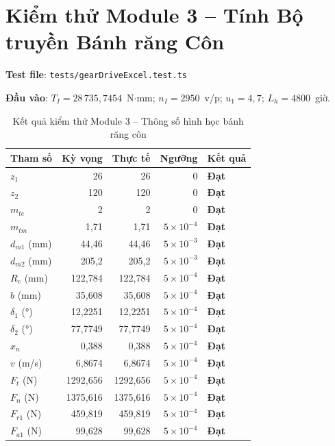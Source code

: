 \section{Kiểm thử Module 3 -- Tính Bộ truyền Bánh răng Côn}
\label{sec:test-m3}

\textbf{Test file}: \texttt{tests/gearDriveExcel.test.ts}

\textbf{Đầu vào}: $T_I = 28\,735{,}7454$~N$\cdot$mm; $n_I = 2950$~v/p;
$u_1 = 4{,}7$; $L_h = 4800$~giờ.

\begin{table}[H]
  \centering
  \caption{Kết quả kiểm thử Module 3 -- Thông số hình học bánh răng côn}
  \label{tab:test-m3-geom}
  \begin{tabular}{lrrrl}
    \toprule
    \textbf{Tham số} & \textbf{Kỳ vọng} & \textbf{Thực tế} & \textbf{Ngưỡng} & \textbf{Kết quả} \\
    \midrule
    $z_1$ & 26 & 26 & 0 & \textbf{Đạt} \\
    $z_2$ & 120 & 120 & 0 & \textbf{Đạt} \\
    $m_{te}$ & 2 & 2 & 0 & \textbf{Đạt} \\
    $m_{tm}$ & 1,71 & 1,71 & $5\times10^{-4}$ & \textbf{Đạt} \\
    $d_{m1}$ (mm) & 44,46 & 44,46 & $5\times10^{-3}$ & \textbf{Đạt} \\
    $d_{m2}$ (mm) & 205,2 & 205,2 & $5\times10^{-3}$ & \textbf{Đạt} \\
    $R_e$ (mm) & 122,784 & 122,784 & $5\times10^{-4}$ & \textbf{Đạt} \\
    $b$ (mm) & 35,608 & 35,608 & $5\times10^{-4}$ & \textbf{Đạt} \\
    $\delta_1$ ($°$) & 12,2251 & 12,2251 & $5\times10^{-4}$ & \textbf{Đạt} \\
    $\delta_2$ ($°$) & 77,7749 & 77,7749 & $5\times10^{-4}$ & \textbf{Đạt} \\
    $x_n$ & 0,388 & 0,388 & $5\times10^{-4}$ & \textbf{Đạt} \\
    $v$ (m/s) & 6,8674 & 6,8674 & $5\times10^{-4}$ & \textbf{Đạt} \\
    $F_t$ (N) & 1292,656 & 1292,656 & $5\times10^{-4}$ & \textbf{Đạt} \\
    $F_n$ (N) & 1375,616 & 1375,616 & $5\times10^{-4}$ & \textbf{Đạt} \\
    $F_{r1}$ (N) & 459,819 & 459,819 & $5\times10^{-4}$ & \textbf{Đạt} \\
    $F_{a1}$ (N) & 99,628 & 99,628 & $5\times10^{-4}$ & \textbf{Đạt} \\
    \bottomrule
  \end{tabular}
\end{table}

